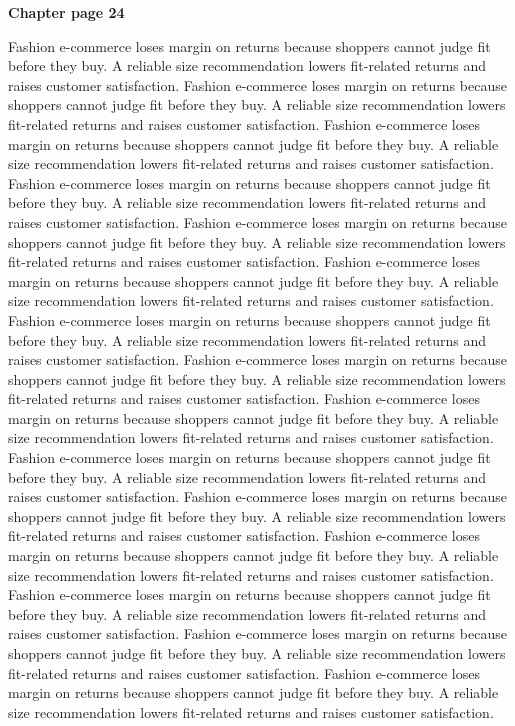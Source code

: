 \documentclass[a4paper,11pt]{article}
\begin{document}
{\headfont\bfseries\Large Chapter page 24}\par\medskip
Fashion e-commerce loses margin on returns because shoppers cannot judge fit before they buy. A reliable size recommendation lowers fit-related returns and raises customer satisfaction. Fashion e-commerce loses margin on returns because shoppers cannot judge fit before they buy. A reliable size recommendation lowers fit-related returns and raises customer satisfaction. Fashion e-commerce loses margin on returns because shoppers cannot judge fit before they buy. A reliable size recommendation lowers fit-related returns and raises customer satisfaction. Fashion e-commerce loses margin on returns because shoppers cannot judge fit before they buy. A reliable size recommendation lowers fit-related returns and raises customer satisfaction. Fashion e-commerce loses margin on returns because shoppers cannot judge fit before they buy. A reliable size recommendation lowers fit-related returns and raises customer satisfaction. 
Fashion e-commerce loses margin on returns because shoppers cannot judge fit before they buy. A reliable size recommendation lowers fit-related returns and raises customer satisfaction. Fashion e-commerce loses margin on returns because shoppers cannot judge fit before they buy. A reliable size recommendation lowers fit-related returns and raises customer satisfaction. Fashion e-commerce loses margin on returns because shoppers cannot judge fit before they buy. A reliable size recommendation lowers fit-related returns and raises customer satisfaction. Fashion e-commerce loses margin on returns because shoppers cannot judge fit before they buy. A reliable size recommendation lowers fit-related returns and raises customer satisfaction. Fashion e-commerce loses margin on returns because shoppers cannot judge fit before they buy. A reliable size recommendation lowers fit-related returns and raises customer satisfaction. 
Fashion e-commerce loses margin on returns because shoppers cannot judge fit before they buy. A reliable size recommendation lowers fit-related returns and raises customer satisfaction. Fashion e-commerce loses margin on returns because shoppers cannot judge fit before they buy. A reliable size recommendation lowers fit-related returns and raises customer satisfaction. Fashion e-commerce loses margin on returns because shoppers cannot judge fit before they buy. A reliable size recommendation lowers fit-related returns and raises customer satisfaction. Fashion e-commerce loses margin on returns because shoppers cannot judge fit before they buy. A reliable size recommendation lowers fit-related returns and raises customer satisfaction. Fashion e-commerce loses margin on returns because shoppers cannot judge fit before they buy. A reliable size recommendation lowers fit-related returns and raises customer satisfaction. \newpage
\end{document}
